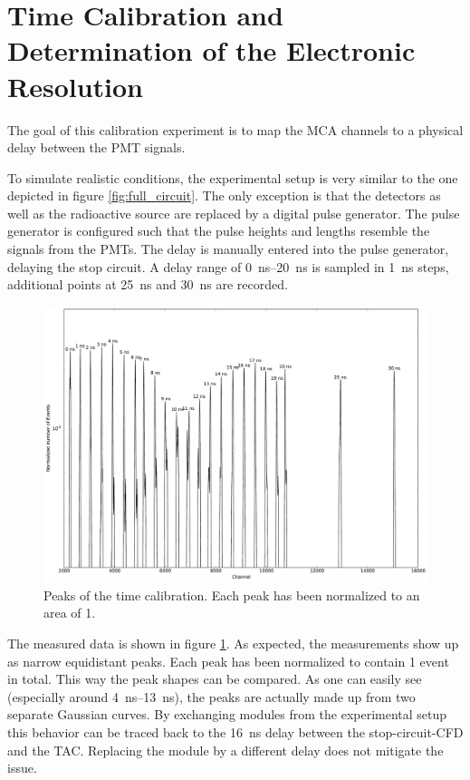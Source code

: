 \documentclass[
	paper=A4,
	parskip=full,
	chapterprefix=true,
	11pt,
	headings=normal,
	bibliography=totoc,
	listof=totoc,
	titlepage=on,
]{scrreprt}
\begin{document}
\FloatBarrier
\section{Time Calibration and Determination of the Electronic Resolution}
The goal of this calibration experiment is to map the MCA channels to a physical delay between the PMT signals. 

To simulate realistic conditions, the experimental setup is very similar to the one depicted in figure \ref{fig:full_circuit}. The only  exception is that the detectors as well as the radioactive source are replaced by a digital pulse generator. The pulse generator is configured such that the pulse heights and lengths resemble the signals from the PMTs.  
The delay is manually entered into the pulse generator, delaying the stop circuit. A delay range of \SIrange{0}{20}{\nano\second} is sampled in \SI{1}{\nano\second} steps, additional points at \SI{25}{\nano\second} and \SI{30}{\nano\second} are recorded.

\begin{figure}
	\centering
	\includegraphics{calibration_peaks}
	\caption{Peaks of the time calibration. Each peak has been normalized to an area of \num{1}.}
	\label{fig:calibration_raw}
\end{figure}

The measured data is shown in figure \ref{fig:calibration_raw}. As expected, the measurements show up as narrow equidistant peaks. Each peak has been normalized to contain \num{1} event in total. This way the peak shapes can be compared. As one can easily see (especially around \SIrange{4}{13}{\nano\second}), the peaks are actually made up from two separate Gaussian curves. By exchanging modules from the experimental setup this behavior can be traced back to the \SI{16}{\nano\second} delay between the stop-circuit-CFD and the TAC. Replacing the module by a different delay does not mitigate the issue.
\end{document}
